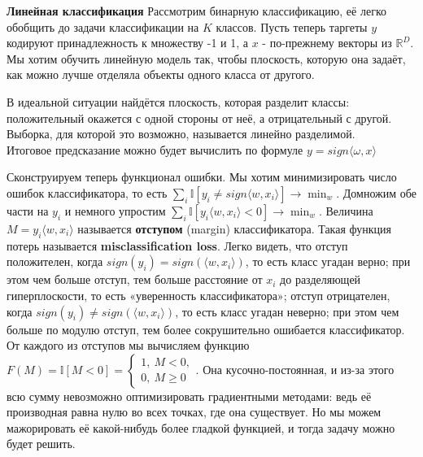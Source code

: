 \textbf{Линейная классификация} Рассмотрим бинарную классификацию, её легко обобщить до задачи классификации на $K$ классов. Пусть теперь таргеты $y$ кодируют принадлежность к множеству -1 и 1, а $x$ - по-прежнему векторы из $\mathbb{R}^D$. Мы хотим обучить линейную модель так, чтобы плоскость, которую она задаёт, как можно лучше отделяла объекты одного класса от другого.

В идеальной ситуации найдётся плоскость, которая разделит классы: положительный окажется с одной стороны от неё, а отрицательный с другой. Выборка, для которой это возможно, называется линейно разделимой. \\
Итоговое предсказание можно будет вычислить по формуле $y = sign\langle\omega,x\rangle$

Сконструируем теперь функционал ошибки. Мы хотим минимизировать число ошибок классификатора, то есть $\sum_i \mathbb{I}[y_i \neq sign \langle w, x_i\rangle]\longrightarrow \min_w$. Домножим обе части на $y_i$ и немного упростим $\sum_i \mathbb{I}[y_i \langle w, x_i\rangle < 0]\longrightarrow \min_w$. Величина $M = y_i \langle w, x_i\rangle$ называется \textbf{отступом} (margin) классификатора. Такая функция потерь называется \textbf{misclassification loss}. Легко видеть, что отступ положителен, когда $sign(y_i) = sign(\langle w, x_i\rangle)$, то есть класс угадан верно; при этом чем больше отступ, тем больше расстояние от $x_i$ до разделяющей гиперплоскости, то есть «уверенность классификатора»; отступ отрицателен, когда $sign(y_i) \ne sign(\langle w, x_i\rangle)$, то есть класс угадан неверно; при этом чем больше по модулю отступ, тем более сокрушительно ошибается классификатор. От каждого из отступов мы вычисляем функцию $F(M) = \mathbb{I}[M < 0] = \begin{cases}1,\ M < 0,\\ 0,\ M\geqslant 0\end{cases}$. Она кусочно-постоянная, и из-за этого всю сумму невозможно оптимизировать градиентными методами: ведь её производная равна нулю во всех точках, где она существует. Но мы можем мажорировать её какой-нибудь более гладкой функцией, и тогда задачу можно будет решить.  \\

